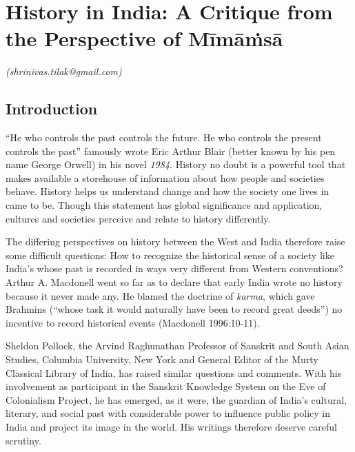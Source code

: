 
\chapter{History in India: A Critique from the Perspective of Mīmāṁsā}\label{chapter2}


\begin{flushright}
\textit{(shrinivas.tilak@gmail.com)}
\end{flushright}


\section*{Introduction}

“He who controls the past controls the future. He who controls the present controls the past” famously wrote Eric Arthur Blair (better known by his pen name George Orwell) in his novel \textit{1984}. History no doubt is a powerful tool that makes available a storehouse of information about how people and societies behave. History helps us understand change and how the society one lives in came to be. Though this statement has global significance and application, cultures and societies perceive and relate to history differently.

The differing perspectives on history between the West and India therefore raise some difficult questions: How to recognize the historical sense of a society like India’s whose past is recorded in ways very different from Western conventions? Arthur A. Macdonell went so far as to declare that early India wrote no history because it never made any. He blamed the doctrine of \textit{karma}, which gave Brahmins (“whose task it would naturally have been to record great deeds”) no incentive to record historical events (Macdonell 1996:10-11).

\newpage

Sheldon Pollock, the Arvind Raghunathan Professor of Sanskrit and South Asian Studies, Columbia University, New York and General Editor of the Murty Classical Library of India, has raised similar questions and comments. With his involvement as participant in the Sanskrit Knowledge System on the Eve of Colonialism Project, he has emerged, as it were, the guardian of India’s cultural, literary, and social past with considerable power to influence public policy in India and project its image in the world. His writings therefore deserve careful scrutiny.

